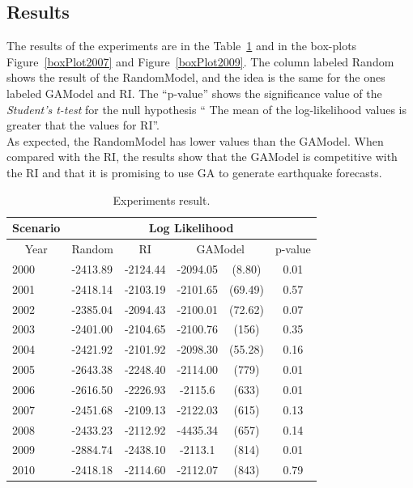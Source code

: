 \subsection{Results}

The results of the experiments are in the Table~\ref{gaxriTable} and in the box-plots Figure~\ref{boxPlot2007} and Figure~\ref{boxPlot2009}. The column labeled Random shows the result of the RandomModel, and the idea is the same for the ones labeled GAModel and RI. The ``p-value'' shows the significance value of the {\it Student's t-test} for the null hypothesis `` The mean of the log-likelihood values is greater that the values for RI''.\\

As expected, the RandomModel has lower values than the GAModel. When compared with the RI, the results show that the GAModel is competitive with the RI and that it is promising to use GA to generate earthquake forecasts.\\

\begin{table}[!ht]
	\begin{center}
		\begin{tabular}{|l|l|c|cc|c|}
			\hline
			\multicolumn{1}{|c|}{Scenario} & \multicolumn{5}{|c|}{Log Likelihood} \\
			\hline
			\multicolumn{1}{|c|}{Year} & \multicolumn{1}{|c|}{Random} & \multicolumn{1}{|c|}{RI} & \multicolumn{2}{c}{GAModel} & \multicolumn{1}{|c|}{p-value} \\    
			\hline
			2000 &-2413.89 &-2124.44 &\raggedright  -2094.05 &\raggedleft (8.80) & 0.01\\%
			2001 &-2418.14 &-2103.19 &\raggedright  -2101.65 &\raggedleft  (69.49) & 0.57\\%
			2002 &-2385.04 &-2094.43 &\raggedright  -2100.01 &\raggedleft (72.62) & 0.07\\%
			2003 &-2401.00 &-2104.65 &\raggedright  -2100.76 &\raggedleft (156) & 0.35\\%
			2004 &-2421.92 &-2101.92 &\raggedright  -2098.30 &\raggedleft (55.28) & 0.16\\%
			2005 &-2643.38 &-2248.40 &\raggedright  -2114.00 &\raggedleft (779) & 0.01\\%
			2006 &-2616.50 &-2226.93 &\raggedright  -2115.6 &\raggedleft (633) & 0.01\\%
			2007 &-2451.68 &-2109.13 &\raggedright  -2122.03 &\raggedleft (615) &  0.13\\%
			2008 &-2433.23 &-2112.92 &\raggedright  -4435.34 &\raggedleft (657) & 0.14\\%
			2009 &-2884.74 &-2438.10 &\raggedright  -2113.1 &\raggedleft (814) & 0.01\\%
			2010 &-2418.18 &-2114.60 &\raggedright -2112.07 &\raggedleft (843) & 0.79\\%
			\hline
		\end{tabular}
	\end{center}
	\caption{Experiments result.}
	\label{gaxriTable}
\end{table}

